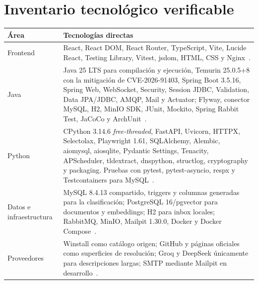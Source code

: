 \section{Inventario tecnológico verificable}

\begin{longtable}{p{}p{}}
	\toprule
	\textbf{Área}             & \textbf{Tecnologías directas}                                                                                                                                                                                                                                                                                                                                             \\
	\midrule
	\endhead
	Frontend                  & React, React DOM, React Router, TypeScript, Vite, Lucide React, Testing Library, Vitest, jsdom, HTML, CSS y Nginx~\cite{react,typescript,vitest,nginx}.                                                                                                                                                                                                                   \\
	Java                      & Java 25 LTS para compilación y ejecución, Temurin 25.0.5+8 con la mitigación de CVE-2026-91403, Spring Boot 3.5.16, Spring Web, WebSocket, Security, Session JDBC, Validation, Data JPA/JDBC, AMQP, Mail y Actuator; Flyway, conector MySQL, H2, MinIO SDK, JUnit, Mockito, Spring Rabbit Test, JaCoCo y ArchUnit~\cite{h2database}.                                      \\
	Python                    & CPython 3.14.6 \emph{free-threaded}, FastAPI, Uvicorn, HTTPX, Selectolax, Playwright 1.61, SQLAlchemy, Alembic, aiomysql, aiosqlite, Pydantic Settings, Tenacity, APScheduler, tldextract, dnspython, structlog, cryptography y packaging. Pruebas con pytest, pytest-asyncio, respx y Testcontainers para MySQL~\cite{fastapi,sqlalchemy,alembic,pytest,testcontainers}. \\
	Datos e infraestructura   & MySQL 8.4.13 compartido, triggers y columnas generadas para la clasificación; PostgreSQL 16/pgvector para documentos y embeddings; H2 para inbox locales; RabbitMQ, MinIO, Mailpit 1.30.0, Docker y Docker Compose~\cite{mysql84,mysql-triggers,h2database,rabbitmq,minio,mailpit}.                                                                                       \\
	Proveedores               & Winstall como catálogo origen; GitHub y páginas oficiales como superficies de resolución; Groq y DeepSeek únicamente para descripciones largas; SMTP mediante Mailpit en desarrollo~\cite{deepseek,mailpit}.                                                                                                                                                              \\

\end{longtable}

